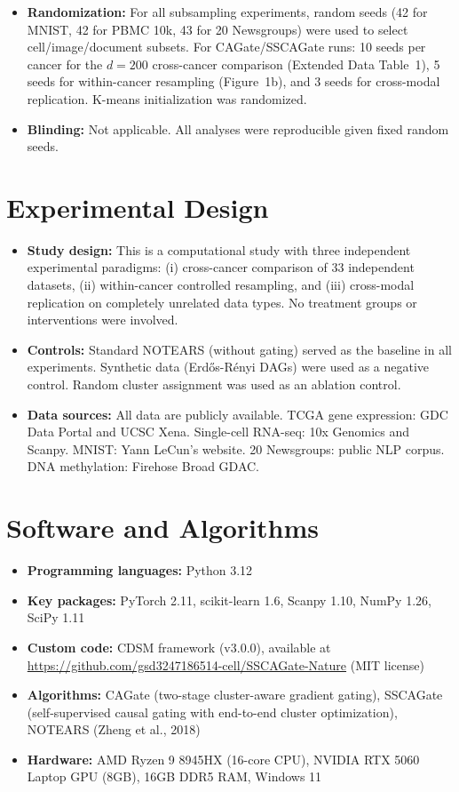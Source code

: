 \documentclass[12pt]{article}
\begin{document}
\begin{itemize}
\item \textbf{Randomization:} For all subsampling experiments, random seeds (42 for MNIST, 42 for PBMC 10k, 43 for 20 Newsgroups) were used to select cell/image/document subsets. For CAGate/SSCAGate runs: 10 seeds per cancer for the $d=200$ cross-cancer comparison (Extended Data Table~1), 5 seeds for within-cancer resampling (Figure~1b), and 3 seeds for cross-modal replication. K-means initialization was randomized.

\item \textbf{Blinding:} Not applicable. All analyses were reproducible given fixed random seeds.
\end{itemize}

\section*{Experimental Design}

\begin{itemize}
\item \textbf{Study design:} This is a computational study with three independent experimental paradigms: (i) cross-cancer comparison of 33 independent datasets, (ii) within-cancer controlled resampling, and (iii) cross-modal replication on completely unrelated data types. No treatment groups or interventions were involved.

\item \textbf{Controls:} Standard NOTEARS (without gating) served as the baseline in all experiments. Synthetic data (Erd\H{o}s-R\'{e}nyi DAGs) were used as a negative control. Random cluster assignment was used as an ablation control.

\item \textbf{Data sources:} All data are publicly available. TCGA gene expression: GDC Data Portal and UCSC Xena. Single-cell RNA-seq: 10x Genomics and Scanpy. MNIST: Yann LeCun's website. 20 Newsgroups: public NLP corpus. DNA methylation: Firehose Broad GDAC.
\end{itemize}

\section*{Software and Algorithms}

\begin{itemize}
\item \textbf{Programming languages:} Python 3.12
\item \textbf{Key packages:} PyTorch 2.11, scikit-learn 1.6, Scanpy 1.10, NumPy 1.26, SciPy 1.11
\item \textbf{Custom code:} CDSM framework (v3.0.0), available at \url{https://github.com/gsd3247186514-cell/SSCAGate-Nature} (MIT license)
\item \textbf{Algorithms:} CAGate (two-stage cluster-aware gradient gating), SSCAGate (self-supervised causal gating with end-to-end cluster optimization), NOTEARS (Zheng et al., 2018)
\item \textbf{Hardware:} AMD Ryzen 9 8945HX (16-core CPU), NVIDIA RTX 5060 Laptop GPU (8GB), 16GB DDR5 RAM, Windows 11
\end{itemize}
\end{document}
